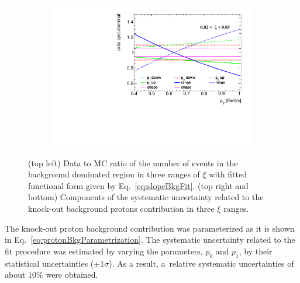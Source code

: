 \begin{figure}[h!]
\begin{subfigure}{.49\textwidth}
 	\end{subfigure}
 	\begin{subfigure}{.49\textwidth}
 		\includegraphics[width=\textwidth,page=3]{chapters/chrgSTAR/img/DCAproton/p_bkg.pdf}
 	\end{subfigure}
 	\caption{(top left) Data to MC ratio of  the  number of events in the background dominated region in three ranges of $\xi$ with fitted functional form given by Eq.~\eqref{eq:slopeBkgFit}. (top right and bottom) Components of the systematic uncertainty related to the  knock-out background protons contribution in three $\xi$ ranges. }
 	\label{fig:protonBkgSyst}
 	
 	\vspace{-1.5cm}
 \end{figure}

The  knock-out proton background contribution was  parameterized as  it is shown in  Eq.~\eqref{eq:protonBkgParametrization}. The systematic uncertainty related to the fit procedure was estimated by varying the   parameters, $p_0$ and $p_1$, by their statistical uncertainties ($\pm1\sigma$).  As a result, a~relative systematic uncertainties of about $10\%$ were obtained.

